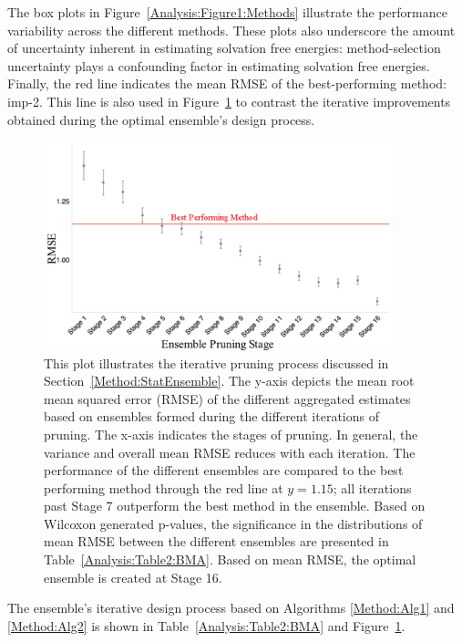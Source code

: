 \documentclass[journal=jpcbfk, manuscript=article]{achemso}
\newcommand{\+}[1]{\ensuremath{\mathbf{#1}}}
\begin{document}
The box plots in Figure~\ref{Analysis:Figure1:Methods} illustrate the performance variability across the different methods.
These plots also underscore the amount of uncertainty inherent in estimating solvation free energies: method-selection uncertainty plays a confounding factor in estimating solvation free energies.
Finally, the red line indicates the mean RMSE of the best-performing method: imp-2.
This line is also used in Figure~\ref{Analysis:Figure2:BMA} to contrast the iterative improvements obtained during the optimal ensemble's design process.
\begin{figure}[h!]
	\centering
	\includegraphics[keepaspectratio,width=0.9\textwidth]{Figures/BMA_Mean_RMSE_Per_Stage_Scatterplot}
	\caption{This plot illustrates the iterative pruning process discussed in Section~\ref{Method:StatEnsemble}. The y-axis depicts the mean root mean squared error (RMSE) of the different aggregated estimates based on ensembles formed during the different iterations of pruning. The x-axis indicates the stages of pruning. In general, the variance and overall mean RMSE reduces with each iteration. The performance of the different ensembles are compared to the best performing method through the red line at $y=1.15$; all iterations past Stage 7 outperform the best method in the ensemble. Based on Wilcoxon generated p-values, the significance in the distributions of mean RMSE between the different ensembles are presented in Table~\ref{Analysis:Table2:BMA}. Based on mean RMSE, the optimal ensemble is created at Stage 16.}
	\label{Analysis:Figure2:BMA}
\end{figure}
The ensemble's iterative design process based on Algorithms \ref{Method:Alg1} and \ref{Method:Alg2} is shown in Table~\ref{Analysis:Table2:BMA} and Figure~\ref{Analysis:Figure2:BMA}.
\end{document}
